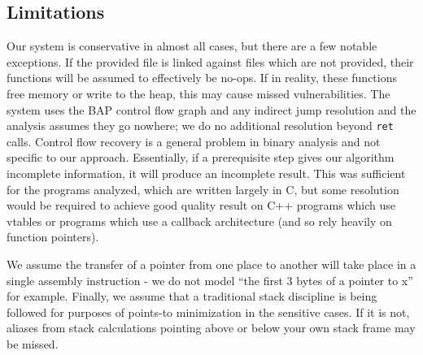 \subsection{Limitations}
Our system is conservative in almost all cases, but there are a few notable exceptions.
If the provided file is linked against files which are not provided, their functions will be assumed to effectively be no-ops.
If in reality, these functions free memory or write to the heap, this may cause missed vulnerabilities.
The system uses the BAP control flow graph and any indirect jump resolution and the analysis assumes they go nowhere; we do no additional resolution beyond \texttt{ret} calls.
Control flow recovery is a general problem in binary analysis and not specific to our approach.
Essentially, if a prerequisite step gives our algorithm incomplete information, it will produce an incomplete result.
This was sufficient for the programs analyzed, which are written largely in C, but some resolution would be required to achieve good quality result on C++ programs which use vtables or programs which use a callback architecture (and so rely heavily on function pointers).

We assume the transfer of a pointer from one place to another will take place in a single assembly instruction - we do not model ``the first 3 bytes of a pointer to x'' for example.
Finally, we assume that a traditional stack discipline is being followed for purposes of points-to minimization in the sensitive cases.
If it is not, aliases from stack calculations pointing above or below your own stack frame may be missed.
